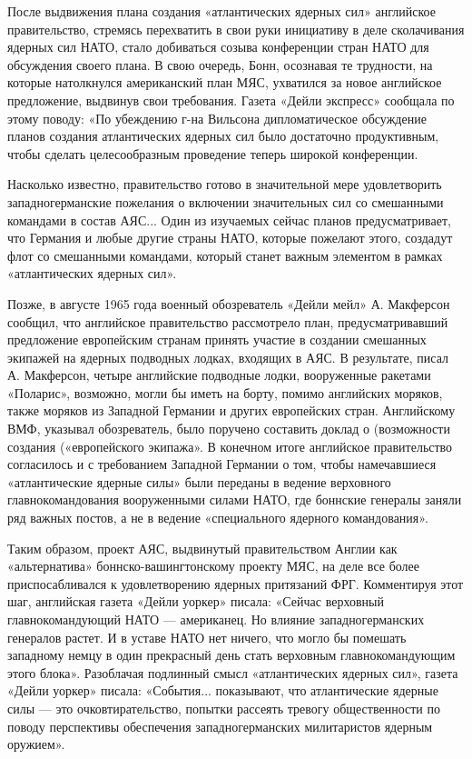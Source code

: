 \documentclass[12pt, a4paper, openany]{book}
\begin{document}
После выдвижения плана создания «атлантических ядерных сил» английское правительство, стремясь перехватить в свои руки инициативу в деле сколачивания ядерных сил НАТО, стало добиваться созыва конференции стран НАТО для обсуждения своего плана. В свою очередь, Бонн, осознавая те трудности, на которые натолкнулся американский план МЯС, ухватился за новое английское предложение, выдвинув свои требования. Газета «Дейли экспресс» сообщала по этому поводу: «По убеждению г-на Вильсона дипломатическое обсуждение планов создания атлантических ядерных сил было достаточно продуктивным, чтобы сделать целесообразным проведение теперь широкой конференции.
		
Насколько известно, правительство готово в значительной мере удовлетворить западногерманские пожелания о включении значительных сил со смешанными командами в состав АЯС... Один из изучаемых сейчас планов предусматривает, что Германия и любые другие страны НАТО, которые пожелают этого, создадут флот со смешанными командами, который станет важным элементом в рамках «атлантических ядерных сил».
		
Позже, в августе 1965 года военный обозреватель «Дейли мейл» А. Макферсон сообщил, что английское правительство рассмотрело план, предусматривавший предложение европейским странам принять участие в создании смешанных экипажей на ядерных подводных лодках, входящих в АЯС. В результате, писал А. Макферсон, четыре английские подводные лодки, вооруженные ракетами «Поларис», возможно, могли бы иметь на борту, помимо английских моряков, также моряков из Западной Германии и других европейских стран. Английскому ВМФ, указывал обозреватель, было поручено составить доклад о (возможности создания («европейского экипажа». В конечном итоге английское правительство согласилось и с требованием Западной Германии о том, чтобы намечавшиеся «атлантические ядерные силы» были переданы в ведение верховного главнокомандования вооруженными силами НАТО, где боннские генералы заняли ряд важных постов, а не в ведение «специального ядерного командования».
		
		Таким образом, проект АЯС, выдвинутый правительством Англии как «альтернатива» боннско-вашингтонскому проекту МЯС, на деле все более приспосабливался к удовлетворению ядерных притязаний ФРГ. Комментируя этот шаг, английская газета «Дейли уоркер» писала: «Сейчас верховный главнокомандующий НАТО — американец. Но влияние западногерманских генералов растет. И в уставе НАТО нет ничего, что могло бы помешать западному немцу в один прекрасный день стать верховным главнокомандующим этого блока». Разоблачая подлинный смысл «атлантических ядерных сил», газета «Дейли уоркер» писала: «События... показывают, что атлантические ядерные силы — это очковтирательство, попытки рассеять тревогу общественности по поводу перспективы обеспечения западногерманских милитаристов ядерным оружием».
		
\end{document}
